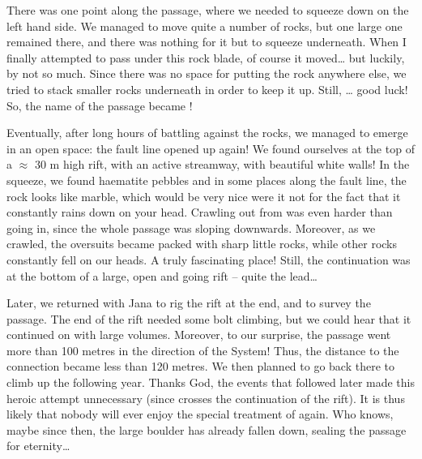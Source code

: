 There was one point along the passage, where we needed to squeeze down
on the left hand side. We managed to move quite a number of rocks, but
one large one remained there, and there was nothing for it but to
squeeze underneath. When I finally attempted to pass under this rock
blade, of course it moved\ldots{} but luckily, by not so much. Since
there was no space for putting the rock anywhere else, we tried to stack
smaller rocks underneath in order to keep it up. Still, \ldots{} good luck! So, the name
of the passage became !

Eventually, after long hours of battling against the rocks, we managed
to emerge in an open space: the fault line opened up again! We found
ourselves at the top of a $\approx$ 30 m high rift, with an
active streamway, with beautiful white walls! In the squeeze, we found
haematite pebbles and in some places along the fault line, the rock
looks like marble, which would be very nice were it not for the fact
that it constantly rains down on your head. Crawling out from
 was even harder than going in, since the whole passage
was sloping downwards. Moreover, as we crawled, the oversuits became
packed with sharp little rocks, while other rocks constantly fell on our
heads. A truly fascinating place! Still, the continuation was at the
bottom of a large, open and going rift -- quite the lead\ldots{}


Later, we returned with Jana to rig the rift at the end, and to survey
the passage. The end of the rift needed some bolt climbing, but we could
hear that it continued on with large volumes. Moreover, to our surprise,
the passage went more than 100 metres in the direction of the System!
Thus, the distance to the connection became less than 120 metres. We
then planned to go back there to climb up the following year. Thanks
God, the events that followed later made this heroic attempt unnecessary
(since 
crosses the continuation of the rift). It is thus likely that nobody
will ever enjoy the special treatment of  again. Who
knows, maybe since then, the large boulder has already fallen down,
sealing the passage for eternity\ldots{}

